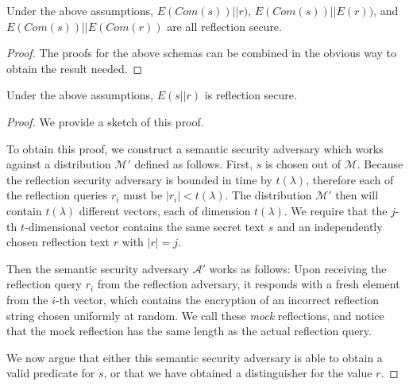 \begin{lemma}
    Under the above assumptions, $E(Com(s)) || r)$, $E(Com(s)) || E(r))$, and
    $E(Com(s)) || E(Com(r))$ are all reflection secure.
\end{lemma}

\begin{proof}
    The proofs for the above schemas can be combined in the obvious way to
    obtain the result needed.
\end{proof}

\begin{lemma}
    Under the above assumptions, $E(s || r)$ is reflection secure.
\end{lemma}

\begin{proof}
    We provide a sketch of this proof.

    To obtain this proof, we construct a semantic security adversary which
    works against a distribution $\mathcal{M'}$ defined as follows. First, $s$
    is chosen out of $\mathcal{M}$. Because the reflection security adversary
    is bounded in time by $t(\lambda)$, therefore each of the reflection
    queries $r_i$ must be $|r_i| < t(\lambda)$. The distribution $\mathcal{M'}$
    then will contain $t(\lambda)$ different vectors, each of dimension
    $t(\lambda)$. We require that the $j$-th $t$-dimensional vector contains
    the same secret text $s$ and an independently chosen reflection text $r$
    with $|r| = j$.

    Then the semantic security adversary $\mathcal{A'}$ works as follows: Upon
    receiving the reflection query $r_i$ from the reflection adversary, it
    responds with a fresh element from the $i$-th vector, which contains the
    encryption of an incorrect reflection string chosen uniformly at random. We
    call these \textit{mock} reflections, and notice that the mock reflection
    has the same length as the actual reflection query.

    We now argue that either this semantic security adversary is able to obtain
    a valid predicate for $s$, or that we have obtained a distinguisher for the
    value $r$.


\end{proof}
